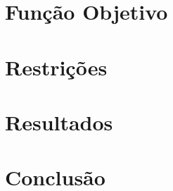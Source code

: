 \documentclass[12pt]{article}
\begin{document}
\section{Função Objetivo}

\section{Restrições}


\section{Resultados}\label{sec:figs}

\section{Conclusão}
\end{document}
